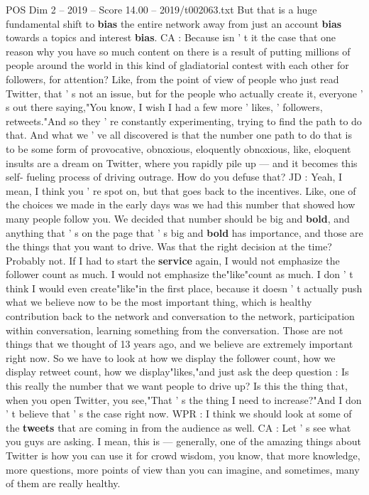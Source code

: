 \begin{textsample}{POS Dim 2 – 2019 – Score 14.00 – 2019/t002063.txt}
But that is a huge fundamental shift to \textbf{bias} the entire network away from just an account \textbf{bias} towards a topics and interest \textbf{bias}.
CA : Because isn ' t it the case that one reason why you have so much content on there is a result of putting millions of people around the world in this kind of gladiatorial contest with each other for followers, for attention?
Like, from the point of view of people who just read Twitter, that ' s not an issue, but for the people who actually create it, everyone ' s out there saying,"You know, I wish I had a few more ' likes, ' followers, retweets."And so they ' re constantly experimenting, trying to find the path to do that.
And what we ' ve all discovered is that the number one path to do that is to be some form of provocative, obnoxious, eloquently obnoxious, like, eloquent insults are a dream on Twitter, where you rapidly pile up — and it becomes this self- fueling process of driving outrage.
How do you defuse that?
JD : Yeah, I mean, I think you ' re spot on, but that goes back to the incentives.
Like, one of the choices we made in the early days was we had this number that showed how many people follow you.
We decided that number should be big and \textbf{bold}, and anything that ' s on the page that ' s big and \textbf{bold} has importance, and those are the things that you want to drive.
Was that the right decision at the time?
Probably not.
If I had to start the \textbf{service} again, I would not emphasize the follower count as much.
I would not emphasize the"like"count as much.
I don ' t think I would even create"like"in the first place, because it doesn ' t actually push what we believe now to be the most important thing, which is healthy contribution back to the network and conversation to the network, participation within conversation, learning something from the conversation.
Those are not things that we thought of 13 years ago, and we believe are extremely important right now.
So we have to look at how we display the follower count, how we display retweet count, how we display"likes,"and just ask the deep question : Is this really the number that we want people to drive up?
Is this the thing that, when you open Twitter, you see,"That ' s the thing I need to increase?"And I don ' t believe that ' s the case right now.
WPR : I think we should look at some of the \textbf{tweets} that are coming in from the audience as well.
CA : Let ' s see what you guys are asking.
I mean, this is — generally, one of the amazing things about Twitter is how you can use it for crowd wisdom, you know, that more knowledge, more questions, more points of view than you can imagine, and sometimes, many of them are really healthy.

\end{textsample}
